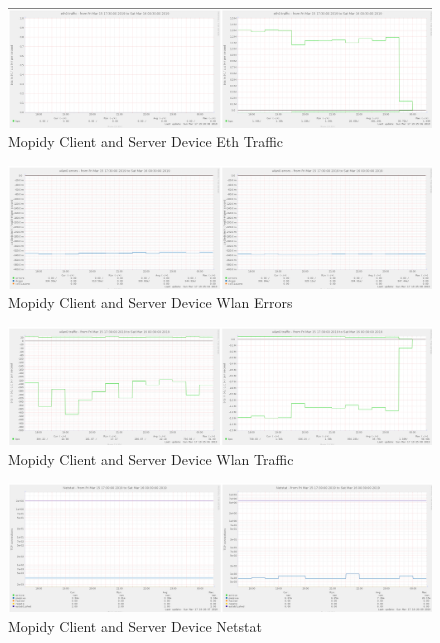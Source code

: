 \documentclass[11pt,a4paper,headinclude=false,footinclude=false]{scrreprt}
\begin{document}
\begin{figure}[H]
\includegraphics{ResultsAndAnalysis/MopidyServerTestImages/011MopidyEth0Traffic.png}
\centering
\caption{Mopidy Client and Server Device Eth Traffic}
\label{MopidyEthTraffic}
\end{figure}

\begin{figure}[H]
\includegraphics{ResultsAndAnalysis/MopidyServerTestImages/022MopidyWlan0Errors.png}
\centering
\caption{Mopidy Client and Server Device Wlan Errors}
\label{MopidyWlanError}
\end{figure}

\begin{figure}[H]
\includegraphics{ResultsAndAnalysis/MopidyServerTestImages/023MopidyWlan0Traffic.png}
\centering
\caption{Mopidy Client and Server Device Wlan Traffic}
\label{MopidyWlanTraffic}
\end{figure}

\begin{figure}[H]
\includegraphics{ResultsAndAnalysis/MopidyServerTestImages/018MopidyNetstat.png}
\centering
\caption{Mopidy Client and Server Device Netstat}
\label{MopidyNetstat}
\end{figure}
\end{document}
